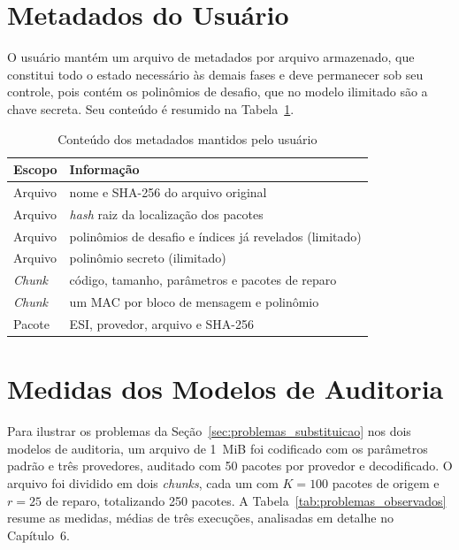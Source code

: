 \section{Metadados do Usuário}
\label{sec:metadados}

O usuário mantém um arquivo de metadados por arquivo armazenado, que constitui todo o estado necessário às demais fases e deve permanecer sob seu controle, pois contém os polinômios de desafio, que no modelo ilimitado são a chave secreta. Seu conteúdo é resumido na Tabela~\ref{tab:metadados}.

\begin{table}[h]
	\centering
	\caption{Conteúdo dos metadados mantidos pelo usuário}
	\label{tab:metadados}
	\begin{tabular}{ll}
		\hline
		\textbf{Escopo} & \textbf{Informação} \\
		\hline
		Arquivo & nome e SHA-256 do arquivo original \\
		Arquivo & \emph{hash} raiz da localização dos pacotes \\
		Arquivo & polinômios de desafio e índices já revelados (limitado) \\
		Arquivo & polinômio secreto (ilimitado) \\
		\emph{Chunk} & código, tamanho, parâmetros e pacotes de reparo \\
		\emph{Chunk} & um \acrshort{MAC} por bloco de mensagem e polinômio \\
		Pacote & \acrshort{ESI}, provedor, arquivo e SHA-256 \\
		\hline
	\end{tabular}
\end{table}

\section{Medidas dos Modelos de Auditoria}
\label{sec:problemas_observados}

Para ilustrar os problemas da Seção~\ref{sec:problemas_substituicao} nos dois modelos de auditoria, um arquivo de 1~MiB foi codificado com os parâmetros padrão e três provedores, auditado com 50 pacotes por provedor e decodificado. O arquivo foi dividido em dois \emph{chunks}, cada um com $K = 100$ pacotes de origem e $r = 25$ de reparo, totalizando 250 pacotes. A Tabela~\ref{tab:problemas_observados} resume as medidas, médias de três execuções, analisadas em detalhe no Capítulo~6.

